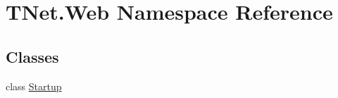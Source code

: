 \hypertarget{namespace_t_net_1_1_web}{}\section{T\+Net.\+Web Namespace Reference}
\label{namespace_t_net_1_1_web}
\subsection*{Classes}
\begin{DoxyCompactItemize}
\item 
class \mbox{\hyperlink{class_t_net_1_1_web_1_1_startup}{Startup}}
\end{DoxyCompactItemize}
